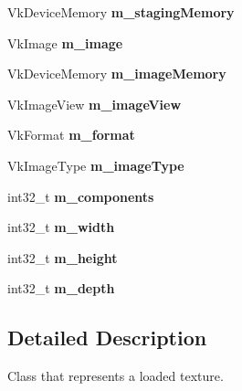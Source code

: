 \begin{DoxyCompactItemize}
\item 
\mbox{\label{class_flounder_1_1_texture_a95e7b0a4025a5e1ce73d014f6f6d4afb}} 
Vk\+Device\+Memory {\bfseries m\+\_\+staging\+Memory}
\item 
\mbox{\label{class_flounder_1_1_texture_aa84f3e5b8d66f2b5fcd3b6e60b8d7b14}} 
Vk\+Image {\bfseries m\+\_\+image}
\item 
\mbox{\label{class_flounder_1_1_texture_a9c7fdb5135e1d756a6defd08d28abe95}} 
Vk\+Device\+Memory {\bfseries m\+\_\+image\+Memory}
\item 
\mbox{\label{class_flounder_1_1_texture_addd663558cc08f30b950dd76d33d3ed2}} 
Vk\+Image\+View {\bfseries m\+\_\+image\+View}
\item 
\mbox{\label{class_flounder_1_1_texture_a24faf9f631d4dbbb4e50701de9d2fe47}} 
Vk\+Format {\bfseries m\+\_\+format}
\item 
\mbox{\label{class_flounder_1_1_texture_aad07154f0c18d0d4762f66d26e44ffd8}} 
Vk\+Image\+Type {\bfseries m\+\_\+image\+Type}
\item 
\mbox{\label{class_flounder_1_1_texture_ae6c5b6324a97ca4e1cf79162bbc67a04}} 
int32\+\_\+t {\bfseries m\+\_\+components}
\item 
\mbox{\label{class_flounder_1_1_texture_aa5b3b6a0c10ff325c608e2c45af7b43b}} 
int32\+\_\+t {\bfseries m\+\_\+width}
\item 
\mbox{\label{class_flounder_1_1_texture_a7bd155b0b2e38f7cf2514531c1b814c3}} 
int32\+\_\+t {\bfseries m\+\_\+height}
\item 
\mbox{\label{class_flounder_1_1_texture_a728bb2b37993d5c3877a2920fe230729}} 
int32\+\_\+t {\bfseries m\+\_\+depth}
\end{DoxyCompactItemize}


\subsection{Detailed Description}
Class that represents a loaded texture. 



